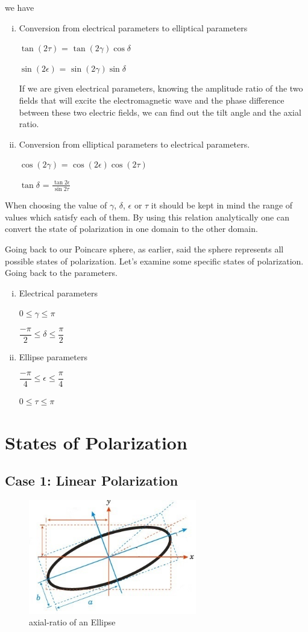 we have 
\begin{enumerate}[(i)]
\item Conversion from electrical parameters to elliptical parameters

$\tan(2\tau)$ = $\tan(2\gamma)$$\cos$$\delta$

$\sin(2\epsilon)$ = $\sin(2\gamma)$$\sin$$\delta$

If we are given electrical parameters, knowing the amplitude ratio of the two fields that will excite the electromagnetic wave and the phase difference between these two electric fields, we can find out the tilt angle and the axial ratio.
\item Conversion from elliptical parameters to electrical parameters.

$\cos(2\gamma)$ = $\cos(2\epsilon)\cos(2\tau)$

$\tan$$\delta$	= $\frac{\tan2\epsilon}{\sin2\tau}$
\end{enumerate}
When choosing the value of $\gamma$, $\delta$, $\epsilon$ or $\tau$ it should be kept in mind the range of values which satisfy each of them. By using this relation analytically one can convert the state of polarization in one domain to the other domain.

Going back to our Poincare sphere, as earlier, said the sphere represents all possible states of polarization. Let's examine some specific states of polarization. Going back to the parameters.
\begin{enumerate}[(i)]
\item Electrical parameters 

0$\leq$$\gamma$$\leq$$\pi$

$\dfrac{-\pi}{2}$$\leq$$\delta$$\leq$$\dfrac{\pi}{2}$
\item Ellipse parameters

$\dfrac{-\pi}{4}$$\leq$$\epsilon$$\leq$$\dfrac{\pi}{4}$

0$\leq$$\tau$$\leq$$\pi$
\end{enumerate}

\section{States of Polarization}
\subsection{Case 1: Linear Polarization}

\begin{figure}[h]
\centering
\includegraphics[height=5cm]{"./graphics/axial ratio"}
\caption{axial-ratio of an Ellipse}
\label{fig:axial-ratio}
\end{figure}

